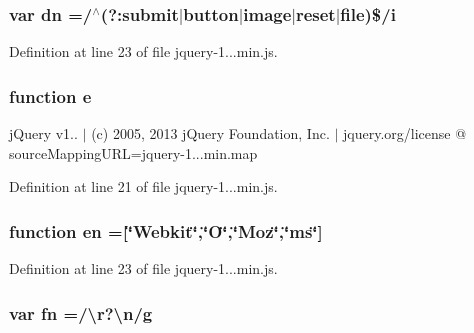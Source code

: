 \subsubsection[{dn}]{\setlength{\rightskip}{0pt plus 5cm}var dn =/$^\wedge$(?\+:submit$\vert${\bf button}$\vert$image$\vert$reset$\vert$file)\$/{\bf i}}\label{_scripts_2jquery-1_810_82_8min_8js_ab5e3f3e2b2507b73e2d8092caa5c8650}


Definition at line 23 of file jquery-\/1...\+min.\+js.

\hypertarget{_scripts_2jquery-1_810_82_8min_8js_a2c038346d47955cbe2cb91e338edd7e1}{}
\subsubsection[{e}]{\setlength{\rightskip}{0pt plus 5cm}function e}\label{_scripts_2jquery-1_810_82_8min_8js_a2c038346d47955cbe2cb91e338edd7e1}
j\+Query v1.. $\vert$ (c) 2005, 2013 j\+Query Foundation, Inc. $\vert$ jquery.\+org/license @ source\+Mapping\+U\+R\+L=jquery-\/1...\+min.\+map 

Definition at line 21 of file jquery-\/1...\+min.\+js.

\hypertarget{_scripts_2jquery-1_810_82_8min_8js_a5d7a777130eac935addcf4926a74b23c}{}
\subsubsection[{en}]{\setlength{\rightskip}{0pt plus 5cm}function en =\mbox{[}\char`\"{}Webkit\char`\"{},\char`\"{}O\char`\"{},\char`\"{}Moz\char`\"{},\char`\"{}ms\char`\"{}\mbox{]}}\label{_scripts_2jquery-1_810_82_8min_8js_a5d7a777130eac935addcf4926a74b23c}


Definition at line 23 of file jquery-\/1...\+min.\+js.

\hypertarget{_scripts_2jquery-1_810_82_8min_8js_a37b9e1ceee4c6d2616fa6081784b5468}{}
\subsubsection[{fn}]{\setlength{\rightskip}{0pt plus 5cm}var fn =/\textbackslash{}r?\textbackslash{}n/{\bf g}}\label{_scripts_2jquery-1_810_82_8min_8js_a37b9e1ceee4c6d2616fa6081784b5468}


